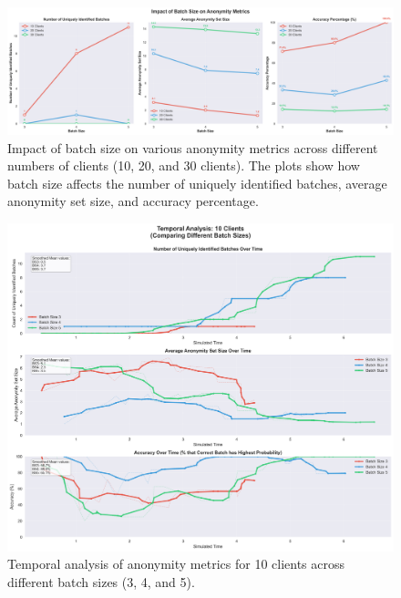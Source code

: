 \documentclass{article}
\begin{document}
\begin{figure}[!htb]
\centering
\includegraphics[width=\textwidth]{diagrams/batch_size_analysis_combined.png}
\caption{Impact of batch size on various anonymity metrics across 
different numbers of clients (10, 20, and 30 clients). 
The plots show how batch size affects the number of uniquely 
identified batches, average anonymity set size, and accuracy percentage.}
\label{fig:batchsize_analysis}
\end{figure}

\begin{figure}[!htb]
\centering
\includegraphics[width=\textwidth]{diagrams/temporal_5_smoothed_10_clients.png}
\caption{Temporal analysis of anonymity metrics for 10 clients across different batch sizes (3, 4, and 5).}
\label{fig:temporal_analysis_10}
\end{figure}
\end{document}
